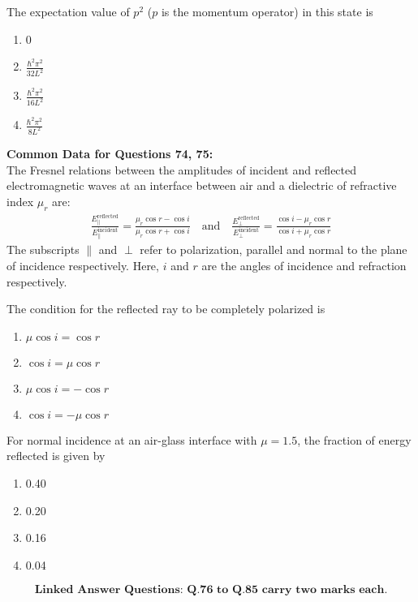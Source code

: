 \item The expectation value of $p^2$ ($p$ is the momentum operator) in this state is 
\begin{multicols}{4}
\begin{enumerate}
    \item 0
    \item $\frac{\hbar^2 \pi^2}{32L^2}$
    \item $\frac{\hbar^2 \pi^2}{16L^2}$
    \item $\frac{\hbar^2 \pi^2}{8L^2}$
\end{enumerate}
\end{multicols}

\textbf{Common Data for Questions 74, 75:} \\
The Fresnel relations between the amplitudes of incident and reflected electromagnetic waves at an interface between air and a dielectric of refractive index $\mu_r$ are:
\begin{align*}
    \frac{E_\parallel^\text{reflected}}{E_\parallel^\text{incident}} = \frac{\mu_r \cos r - \cos i}{\mu_r \cos r + \cos i} 
    \quad \text{and} \quad
    \frac{E_\perp^\text{reflected}}{E_\perp^\text{incident}} = \frac{\cos i - \mu_r \cos r}{\cos i + \mu_r \cos r}
\end{align*}
The subscripts $\parallel$ and $\perp$ refer to polarization, parallel and normal to the plane of incidence respectively. Here, $i$ and $r$ are the angles of incidence and refraction respectively.

\item The condition for the reflected ray to be completely polarized is
\begin{multicols}{4}
\begin{enumerate}
    \item $\mu \cos i = \cos r$
    \item $\cos i = \mu \cos r$
    \item $\mu \cos i = -\cos r$
    \item $\cos i = -\mu \cos r$
\end{enumerate}
\end{multicols}

\item For normal incidence at an air-glass interface with $\mu = 1.5$, the fraction of energy reflected is given by
\begin{multicols}{4}
\begin{enumerate}
    \item 0.40
    \item 0.20
    \item 0.16
    \item 0.04
\end{enumerate}
\end{multicols}
$$\textbf{Linked Answer Questions: Q.76 to Q.85 carry two marks each.}$$

